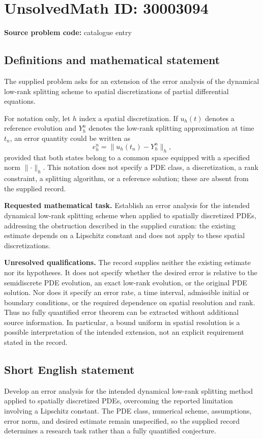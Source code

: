 \documentclass[11pt]{article}
\begin{document}
\section*{UnsolvedMath ID: 30003094}
\textbf{Source problem code:} catalogue entry
\subsection{Definitions and mathematical statement}
The supplied problem asks for an extension of the error analysis of the dynamical low-rank splitting scheme to spatial discretizations of partial differential equations.

For notation only, let \(h\) index a spatial discretization. If \(u_h(t)\) denotes a reference evolution and \(Y_h^n\) denotes the low-rank splitting approximation at time \(t_n\), an error quantity could be written as
\[
 e_h^n=\lVert u_h(t_n)-Y_h^n\rVert_h,
\]
provided that both states belong to a common space equipped with a specified norm \(\lVert\cdot\rVert_h\). This notation does not specify a PDE class, a discretization, a rank constraint, a splitting algorithm, or a reference solution; these are absent from the supplied record.

\textbf{Requested mathematical task.} Establish an error analysis for the intended dynamical low-rank splitting scheme when applied to spatially discretized PDEs, addressing the obstruction described in the supplied curation: the existing estimate depends on a Lipschitz constant and does not apply to these spatial discretizations.

\textbf{Unresolved qualifications.} The record supplies neither the existing estimate nor its hypotheses. It does not specify whether the desired error is relative to the semidiscrete PDE evolution, an exact low-rank evolution, or the original PDE solution. Nor does it specify an error rate, a time interval, admissible initial or boundary conditions, or the required dependence on spatial resolution and rank. Thus no fully quantified error theorem can be extracted without additional source information. In particular, a bound uniform in spatial resolution is a possible interpretation of the intended extension, not an explicit requirement stated in the record.
\subsection{Short English statement}
Develop an error analysis for the intended dynamical low-rank splitting method applied to spatially discretized PDEs, overcoming the reported limitation involving a Lipschitz constant. The PDE class, numerical scheme, assumptions, error norm, and desired estimate remain unspecified, so the supplied record determines a research task rather than a fully quantified conjecture.
\end{document}
